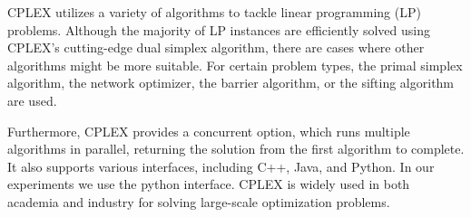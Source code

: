 CPLEX utilizes a variety of algorithms to tackle linear programming (LP) problems.
Although the majority of LP instances are efficiently solved using CPLEX's
cutting-edge dual simplex algorithm, there are cases where other algorithms might be more suitable.
For certain problem types, the primal simplex algorithm, the network optimizer, the barrier algorithm,
or the sifting algorithm are used. 

Furthermore, CPLEX provides a concurrent option, which runs multiple algorithms in parallel,
returning the solution from the first algorithm to complete.
It also supports various interfaces, including C++, Java, and Python. In our experiments
we use the python interface.
CPLEX is widely used in both academia and industry for solving large-scale optimization
problems.
